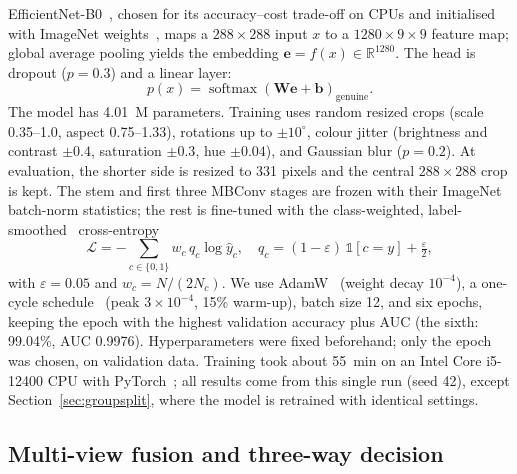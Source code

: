 \documentclass[pdflatex,sn-mathphys-num]{sn-jnl}
\begin{document}
EfficientNet-B0~\cite{tan2019efficientnet}, chosen for its accuracy--cost trade-off on
CPUs and initialised with ImageNet weights~\cite{deng2009imagenet}, maps a
$288\times288$ input $x$ to a $1280\times9\times9$ feature map; global average pooling
yields the embedding $\mathbf{e}=f(x)\in\mathbb{R}^{1280}$. The head is dropout
($p=0.3$) and a linear layer:
\begin{equation}
p(x) = \operatorname{softmax}\!\left(\mathbf{W}\mathbf{e}+\mathbf{b}\right)_{\text{genuine}} .
\label{eq:prob}
\end{equation}
The model has 4.01~M parameters. Training uses random resized crops (scale 0.35--1.0,
aspect 0.75--1.33), rotations up to $\pm10^\circ$, colour jitter (brightness and contrast
$\pm0.4$, saturation $\pm0.3$, hue $\pm0.04$), and Gaussian blur ($p=0.2$). At
evaluation, the shorter side is resized to 331 pixels and the central $288\times288$
crop is kept. The stem and first three MBConv stages are frozen with their ImageNet
batch-norm statistics; the rest is fine-tuned with the class-weighted,
label-smoothed~\cite{szegedy2016inception} cross-entropy
\begin{equation}
\mathcal{L} = -\sum_{c\in\{0,1\}} w_c\, q_c \log \hat{y}_c, \quad
q_c = (1-\varepsilon)\,\mathbb{1}[c=y] + \tfrac{\varepsilon}{2},
\label{eq:loss}
\end{equation}
with $\varepsilon=0.05$ and $w_c=N/(2N_c)$. We use AdamW~\cite{loshchilov2019adamw}
(weight decay $10^{-4}$), a one-cycle schedule~\cite{smith2019superconvergence} (peak
$3\times10^{-4}$, 15\% warm-up), batch size 12, and six epochs, keeping the epoch with
the highest validation accuracy plus AUC (the sixth: 99.04\%, AUC 0.9976).
Hyperparameters were fixed beforehand; only the epoch was chosen, on validation data. Training took about 55~min on an Intel Core i5-12400 CPU with
PyTorch~\cite{paszke2019pytorch}; all results come from this single run (seed 42),
except Section~\ref{sec:groupsplit}, where the model is retrained with identical settings.

\subsection{Multi-view fusion and three-way decision}\label{sec:decision}
\end{document}
